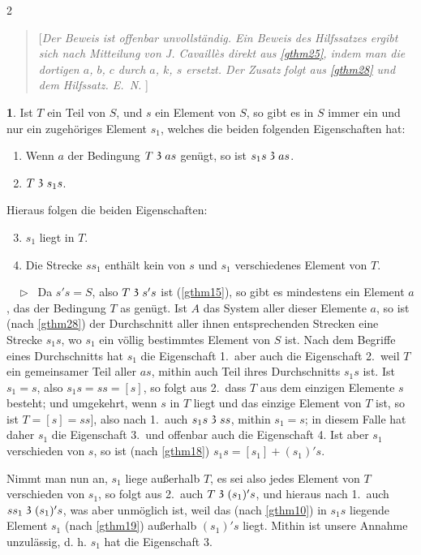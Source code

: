 \documentclass[leqno,hidelinks,10pt]{article}
\theoremstyle{definition}
\newtheorem{satz}{\protect\satzname}
\newcommand{\satzname}{}
\renewcommand{\satzname}{\hspace{-4pt}.\ Satz}%
\renewcommand{\satzname}{\hspace{-4pt}.\ Theorem}%
\newcommand\beweis{ $ \phantom{'.'} \rhd \ $}%
\newcommand\TeilVon{\mathrel{\raisebox{0.45ex}{$\mathfrak{3}$}}}
\newcommand{\sref}[1]{\underline{\ref{#1}}}%
\begin{document}
\begin{paracol}{2}
\begin{leftcolumn}
\begin{quote}
[\emph{Der Beweis ist offenbar unvollständig. Ein Beweis des Hilfssatzes ergibt
sich nach Mitteilung von J. Cavaillès direkt aus \sref{gthm25}, indem man die
dortigen $a$, $b$, $c$ durch $a$, $k$, $s$ ersetzt.
Der Zusatz folgt aus \sref{gthm28} und dem Hilfssatz. E.~N.
}] \end{quote}

\begin{satz}\label{gthm29}
Ist $T$ ein Teil von $S$, und $s$ ein Element von $S$, so gibt es in $S$ immer ein
und nur ein zugehöriges Element $s_1$, welches die beiden folgenden Eigenschaften hat:
\begin{enumerate} \setcounter{enumi}{0} \setlength\itemsep{-0.25em}
   \item  Wenn $a$ der Bedingung $T \TeilVon as$ genügt, so ist $s_1s \TeilVon as$.
   \item $T \TeilVon s_1s$.
\end{enumerate}

Hieraus folgen die beiden Eigenschaften:
\begin{enumerate} \setcounter{enumi}{2} \setlength\itemsep{-0.25em}
    \item $s_1$ liegt in $T$.
    \item Die Strecke $ss_1$ enthält kein von $s$ und $s_1$ verschiedenes Element von $T$.
\end{enumerate}
\beweis
Da $s's = S$, also $T \TeilVon s's$ ist (\sref{gthm15}), so gibt es mindestens
ein Element $a$, das der Bedingung $T$ as genügt. Ist $A$ das System aller dieser
Elemente $a$, so ist (nach \sref{gthm28}) der Durchschnitt aller ihnen entsprechenden
Strecken eine Strecke $s_1s$, wo $s_1$ ein völlig bestimmtes Element von $S$ ist.
Nach dem Begriffe eines Durchschnitts hat $s_1$ die Eigenschaft 1.\, aber auch die
Eigenschaft 2.\, weil $T$ ein gemeinsamer Teil aller $as$, mithin auch Teil ihres
Durchschnitts $s_1s$ ist. Ist $s_1 = s$, also $s_1s = ss = [s]$, so folgt aus 2.\,
dass $T$ aus dem einzigen Elemente $s$ besteht; und umgekehrt, wenn $s$ in $T$
liegt und das einzige Element von $T$ ist, so ist $T = [s] = ss]$, also nach 1.\
auch $s_1s \TeilVon ss$, mithin $s_1 = s$; in diesem Falle hat daher $s_1$ die
Eigenschaft 3.\ und offenbar auch die Eigenschaft 4. Ist aber $s_1$ verschieden
von $s$, so ist (nach \sref{gthm18}) $s_1s = [s_1] + (s_1)'s$.

Nimmt man nun an, $s_1$ liege außerhalb $T$, es sei also jedes Element von $T$
verschieden von $s_1$, so folgt aus 2.\ auch $T \TeilVon (s_1)'s$, und hieraus
nach 1.\ auch $ss_1 \TeilVon (s_1)'s$, was aber unmöglich ist, weil das (nach
\sref{gthm10}) in $s_1s$ liegende Element $s_1$ (nach \sref{gthm19}) außerhalb
$(s_1)'s$ liegt. Mithin ist unsere Annahme unzulässig, d. h.  $s_1$  hat die
Eigenschaft 3.


\end{satz}
\end{leftcolumn}
\end{paracol}
\end{document}
